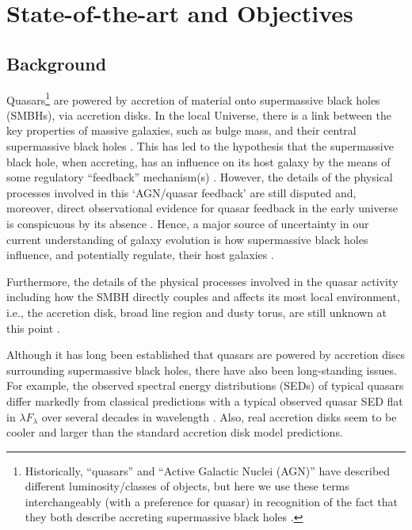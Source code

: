 \section{State-of-the-art and Objectives}
\vspace{-4pt}

\subsection{Background}
\noindent
Quasars\footnote{ Historically, ``quasars'' and ``Active Galactic
Nuclei (AGN)'' have described different luminosity/classes of objects,
but here we use these terms interchangeably (with a preference for
quasar) in recognition of the fact that they both describe accreting
supermassive black holes \citep[e.g.][]{Haardt2016book}.}  are powered
by accretion of material onto supermassive black holes (SMBHs), via
accretion disks.  In the local Universe, there is a link between the
key properties of massive galaxies, such as bulge mass, and their
central supermassive black holes \citep[e.g., ][]{McLure_Dunlop2002,
HaringRix2004, Salviander2007, Greene2010, KormendyHo2013}. This has
led to the hypothesis that the supermassive black hole, when accreting,
has an influence on its host galaxy by the means of some regulatory
``feedback'' mechanism(s) \citep[e.g., ][]{Sijacki2007, Hopkins2008a,
AlexanderHickox2012, Fabian2012, KingPounds2015}. However, the details
of the physical processes involved in this `AGN/quasar feedback' are
still disputed and, moreover, direct observational evidence for quasar
feedback in the early universe is conspicuous by its absence
\citep[e.g., ][]{HeckmanBest2014, NaabOstriker2017}. Hence, a major
source of uncertainty in our current understanding of galaxy evolution
is how supermassive black holes influence, and potentially regulate,
their host galaxies \citep{Vogelsberger2013, Vogelsberger2014,
Schaye2015, Angles-Alcazar2013, Angles-Alcazar2017}.


\smallskip 
\smallskip
\noindent
Furthermore, the details of the physical processes involved in the
quasar activity including how the SMBH directly couples and affects
its most local environment, i.e., the accretion disk, broad line
region and dusty torus, are still unknown at this point
\citep[e.g.,][]{Netzer2015, Padovani2017}.

\smallskip 
\smallskip
\noindent
Although it has long been established that quasars are powered by
accretion discs surrounding supermassive black holes, there have also
been long-standing issues. For example, the observed spectral energy
distributions (SEDs) of typical quasars
\citep[e.g.,][]{Koratkar_Blaes1999, Sirko_Goodman2003} differ markedly
from classical predictions \citep[][]{SS73, Pringle1981} with a
typical observed quasar SED flat in $\lambda F_{\lambda}$ over several
decades in wavelength \citep{Elvis1994, Richards2006b}.  Also, real
accretion disks seem to be cooler \cite[e.g., ][]{Lawrence2012} and
larger \cite[e.g.,][]{Pooley2007, Morgan2010, Morgan2012,
Mosquera2011} than the standard accretion disk model predictions.

